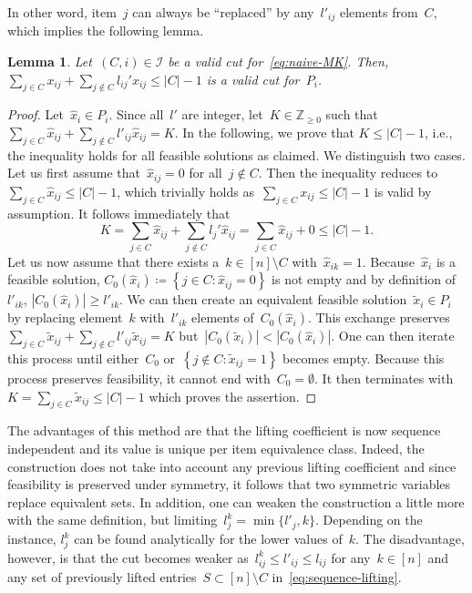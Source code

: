 \documentclass[a4paper,10pt]{article}
\newcommand{\Z}{\mathds{Z}}
\newcommand{\fixed}[1]{\hat{ #1 }}
\newcommand{\lift}{l}
\newcommand{\define}{\coloneqq}
\newcommand{\card}[1]{\left\lvert #1 \right\rvert}
\newcommand{\brackets}[1]{\left\{ #1 \right\}}
\newtheorem{lemma}[theorem]{Lemma}
\theoremstyle{definition}
\begin{document}
%
In other word, item~$j$ can always be ``replaced'' by any~$\lift'_{ij}$ elements from~$C$, which implies the following lemma.
%
\begin{lemma}
  Let~$(C, i)\in\mathcal{I}$ be a valid cut for~\eqref{eq:naive-MK}.
  Then, $\sum_{j\in C} x_{ij} + \sum_{j\notin C} \lift_{ij}' x_{ij} \leq \card{C}-1$ is a valid cut for~$P_i$.
\end{lemma}
\begin{proof}
  Let~$\fixed{x}_i\in P_i$.
  Since all~$\lift'$ are integer, let~$K\in\Z_{\geq 0}$ such that~$\sum_{j\in C} \fixed{x}_{ij} + \sum_{j\notin C} \lift'_{ij} \fixed{x}_{ij} =K$.
  In the following, we prove that $K \leq |C| - 1$, i.e., the inequality holds for all feasible solutions as claimed.
  We distinguish two cases.
  Let us first assume that~$\fixed{x}_{ij} = 0$ for all~$j\notin C$.
  Then the inequality reduces to~$\sum_{j\in C} \hat{x}_{ij} \leq |C|-1$, which trivially holds as~$\sum_{j\in C} x_{ij} \leq |C|-1$ is valid by assumption.
  It follows immediately that
  \begin{equation}
    K = \sum_{j\in C} \fixed{x}_{ij} + \sum_{j\notin C} \lift_j' \fixed{x}_{ij} = \sum_{j\in C} \fixed{x}_{ij} + 0 \leq |C| -1.
  \end{equation}
  Let us now assume that there exists a~$k\in [n]\setminus C$ with~$\fixed{x}_{ik} = 1$.
  Because~$\fixed{x}_i$ is a feasible solution, $C_0(\fixed{x}_i) \define\brackets{j\in C: \fixed{x}_{ij} = 0}$ is not empty and by definition of~$\lift'_{ik}$, $|C_0(\fixed{x}_i)|\geq \lift'_{ik}$.
  We can then create an equivalent feasible solution~$\tilde{x}_i\in P_i$ by replacing element~$k$ with~$\lift'_{ik}$ elements of~$C_0(\fixed{x}_i)$.
  This exchange preserves~$\sum_{j\in C} \tilde{x}_{ij} + \sum_{j\notin C} \lift'_{ij} \tilde{x}_{ij} =K$ but~$|C_0(\tilde{x}_i)| < |C_0(\fixed{x}_i)|$.
  One can then iterate this process until either~$C_0$ or~$\brackets{j\notin C : \tilde{x}_{ij} = 1}$ becomes empty.
  Because this process preserves feasibility, it cannot end with~$C_0 = \emptyset$.
  It then terminates with~$K = \sum_{j\in C} \tilde{x}_{ij} \leq |C|-1$ which proves the assertion.
\end{proof}
%
The advantages of this method are that the lifting coefficient is now sequence independent and its value is unique per item equivalence class.
Indeed, the construction does not take into account any previous lifting coefficient and since feasibility is preserved under symmetry, it follows that two symmetric variables replace equivalent sets.
In addition, one can weaken the construction a little more with the same definition, but limiting~$\lift^k_j = \min\{\lift'_j, k\}$.
Depending on the instance, $\lift^k_j$ can be found analytically for the lower values of~$k$.
The disadvantage, however, is that the cut becomes weaker as~$\lift^k_{ij} \leq \lift'_{ij} \leq \lift_{ij}$ for any~$k\in [n]$ and any set of previously lifted entries~$S\subset [n]\setminus C$ in~\eqref{eq:sequence-lifting}.
\end{document}
